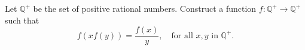 Let $\mathbb{Q}^{+}$ be the set of positive rational numbers. Construct a function $f:\mathbb{Q}^{+} \to \mathbb{Q}^{+}$ such that
\[ f(xf(y)) = \frac{f(x)}{y}, \quad \text{for all } x,y \text{ in } \mathbb{Q}^{+}. \]
